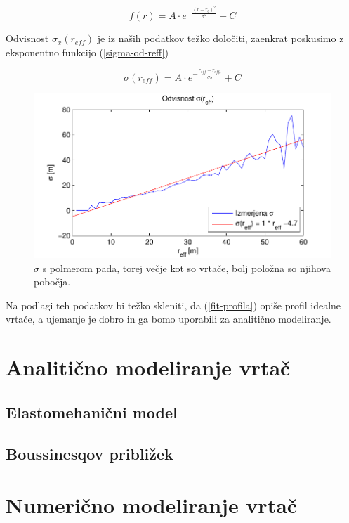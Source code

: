 \documentclass[a4paper, oneside, 12pt]{book}
\begin{document}
\begin{equation}
  f(r) = A \cdot e^{-\frac{(r-r_0)^2}{\sigma^2}} + C  
  \label{fit-profila}
\end{equation}

Odvisnost $\sigma_x(r_{eff})$ je iz naših podatkov težko določiti, zaenkrat poskusimo z eksponentno funkcijo (\ref{sigma-od-reff})


\begin{equation}
  \sigma (r_{eff}) = A \cdot e^{-\frac{r_{eff}-r_{eff_0}}{\sigma_{\sigma}}} + C 
  \label{sigma-od-reff}
\end{equation}

\begin{figure}[H]
  \centering
  \includegraphics{slike/menisija-sigme}
  \caption{$\sigma$ s polmerom pada, torej večje kot so vrtače, bolj položna so njihova pobočja.}
  \label{fig:menisija-sigma}
\end{figure}

Na podlagi teh podatkov bi težko skleniti, da (\ref{fit-profila}) opiše profil idealne vrtače, a ujemanje je dobro in ga bomo uporabili za analitično modeliranje. 


\chapter{Analitično modeliranje vrtač}
\label{ch2}

\section{Elastomehanični model}
\section{Boussinesqov približek}


\chapter{Numerično modeliranje vrtač} 
\label{ch3}
\end{document}
